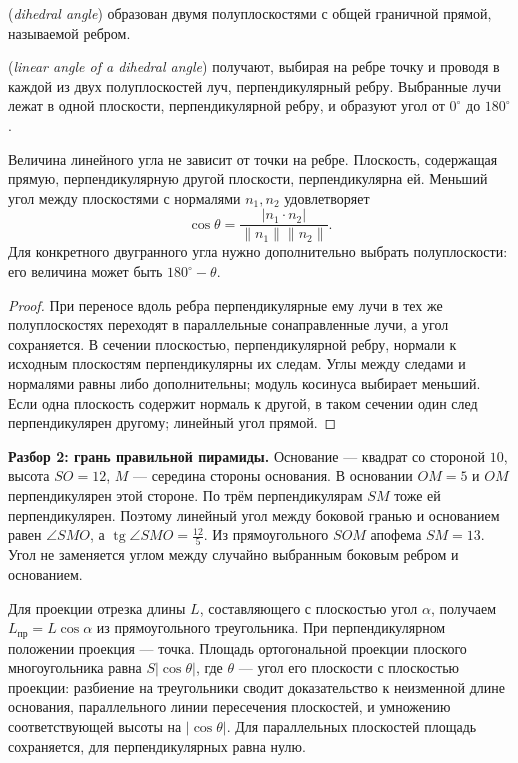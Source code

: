 \begin{definition} (\emph{dihedral angle}) образован двумя полуплоскостями с общей граничной прямой, называемой ребром.
\par{} (\emph{linear angle of a dihedral angle}) получают, выбирая на ребре точку и проводя в каждой из двух полуплоскостей луч, перпендикулярный ребру. Выбранные лучи лежат в одной плоскости, перпендикулярной ребру, и образуют угол от \(0^\circ\) до \(180^\circ\).\end{definition}
\begin{theorem}
Величина линейного угла не зависит от точки на ребре. Плоскость, содержащая прямую, перпендикулярную другой плоскости, перпендикулярна ей. Меньший угол между плоскостями с нормалями \(n_1,n_2\) удовлетворяет
\[
\cos\theta=\frac{|n_1\cdot n_2|}{\|n_1\|\|n_2\|}.
\]
Для конкретного двугранного угла нужно дополнительно выбрать полуплоскости: его величина может быть \(180^\circ-\theta\).
\end{theorem}
\begin{proof}При переносе вдоль ребра перпендикулярные ему лучи в тех же полуплоскостях переходят в параллельные сонаправленные лучи, а угол сохраняется. В сечении плоскостью, перпендикулярной ребру, нормали к исходным плоскостям перпендикулярны их следам. Углы между следами и нормалями равны либо дополнительны; модуль косинуса выбирает меньший. Если одна плоскость содержит нормаль к другой, в таком сечении один след перпендикулярен другому; линейный угол прямой.\end{proof}
\begin{example}\textbf{Разбор 2: грань правильной пирамиды.} Основание — квадрат со стороной \(10\), высота \(SO=12\), \(M\) — середина стороны основания. В основании \(OM=5\) и \(OM\) перпендикулярен этой стороне. По трём перпендикулярам \(SM\) тоже ей перпендикулярен. Поэтому линейный угол между боковой гранью и основанием равен \(\angle SMO\), а \(\operatorname{tg}\angle SMO=\frac{12}{5}\). Из прямоугольного \(SOM\) апофема \(SM=13\). Угол не заменяется углом между случайно выбранным боковым ребром и основанием.\end{example}
Для проекции отрезка длины \(L\), составляющего с плоскостью угол \(\alpha\), получаем \(L_{\mathrm{пр}}=L\cos\alpha\) из прямоугольного треугольника. При перпендикулярном положении проекция — точка. Площадь ортогональной проекции плоского многоугольника равна \(S|\cos\theta|\), где \(\theta\) — угол его плоскости с плоскостью проекции: разбиение на треугольники сводит доказательство к неизменной длине основания, параллельного линии пересечения плоскостей, и умножению соответствующей высоты на \(|\cos\theta|\). Для параллельных плоскостей площадь сохраняется, для перпендикулярных равна нулю.

